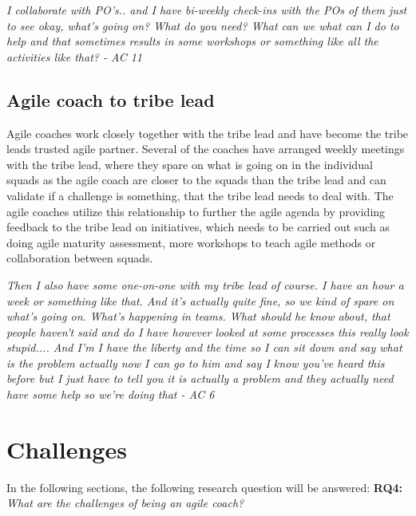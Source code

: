 \documentclass[11pt,a4paper]{report}
\begin{document}
\begin{displayquote}
\textit{
I collaborate with PO's.. and I have bi-weekly check-ins with the POs of them just to see okay, what's going on? What do you need? What can we what can I do to help and that sometimes results in some workshops or something like all the activities like that? - AC 11
}
\end{displayquote}

\subsection{Agile coach to tribe lead}
Agile coaches work closely together with the tribe lead and have become the tribe leads trusted agile partner. Several of the coaches have arranged weekly meetings with the tribe lead, where they spare on what is going on in the individual squads as the agile coach are closer to the squads than the tribe lead and can validate if a challenge is something, that the tribe lead needs to deal with. The agile coaches utilize this relationship to further the agile agenda by providing feedback to the tribe lead on initiatives, which needs to be carried out such as doing agile maturity assessment, more workshops to teach agile methods or collaboration between squads. 

\begin{displayquote}
\textit{
Then I also have some one-on-one with my tribe lead of course. I have an hour a week or something like that. And it's actually quite fine, so we kind of spare on what's going on. What's happening in teams. What should he know about, that people haven't said and do I have however looked at some processes this really look stupid.... And I'm I have the liberty and the time so I can sit down and say what is the problem actually now I can go to him and say I know you've heard this before but I just have to tell you it is actually a problem and they actually need have some help so we're doing that - AC 6}
\end{displayquote}

\section{Challenges}
\label{Challenges}
In the following sections, the following research question will be answered:
\newline
\newline
\textbf{RQ4:} \emph{What are the challenges of being an agile coach?}
\end{document}
